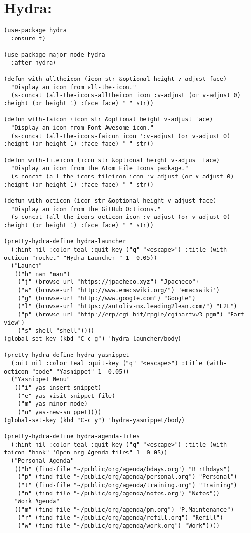 \documentclass[11pt]{article}
\begin{document}
\section{Hydra:}
\label{sec:org7b42eff}
\begin{verbatim}
(use-package hydra
  :ensure t)

(use-package major-mode-hydra
  :after hydra)

(defun with-alltheicon (icon str &optional height v-adjust face)
  "Display an icon from all-the-icon."
  (s-concat (all-the-icons-alltheicon icon :v-adjust (or v-adjust 0) :height (or height 1) :face face) " " str))

(defun with-faicon (icon str &optional height v-adjust face)
  "Display an icon from Font Awesome icon."
  (s-concat (all-the-icons-faicon icon ':v-adjust (or v-adjust 0) :height (or height 1) :face face) " " str))

(defun with-fileicon (icon str &optional height v-adjust face)
  "Display an icon from the Atom File Icons package."
  (s-concat (all-the-icons-fileicon icon :v-adjust (or v-adjust 0) :height (or height 1) :face face) " " str))

(defun with-octicon (icon str &optional height v-adjust face)
  "Display an icon from the GitHub Octicons."
  (s-concat (all-the-icons-octicon icon :v-adjust (or v-adjust 0) :height (or height 1) :face face) " " str))

(pretty-hydra-define hydra-launcher
  (:hint nil :color teal :quit-key ("q" "<escape>") :title (with-octicon "rocket" "Hydra Launcher " 1 -0.05))
  ("Launch"
   (("h" man "man")
    ("j" (browse-url "https://jpacheco.xyz") "Jpacheco")
    ("w" (browse-url "http://www.emacswiki.org/") "emacswiki")
    ("g" (browse-url "http://www.google.com") "Google")
    ("l" (browse-url "https://autoliv-mx.leading2lean.com/") "L2L")
    ("p" (browse-url "http://erp/cgi-bit/rpgle/cgipartvw3.pgm") "Part-view")
    ("s" shell "shell"))))
(global-set-key (kbd "C-c g") 'hydra-launcher/body)

(pretty-hydra-define hydra-yasnippet 
  (:nit nil :color teal :quit-key ("q" "<escape>") :title (with-octicon "code" "Yasnippet" 1 -0.05))
  ("Yasnippet Menu"
   (("i" yas-insert-snippet)
    ("e" yas-visit-snippet-file)
    ("m" yas-minor-mode)
    ("n" yas-new-snippet))))
(global-set-key (kbd "C-c y") 'hydra-yasnippet/body)

(pretty-hydra-define hydra-agenda-files
  (:hint nil :color teal :quit-key ("q" "<escape>") :title (with-faicon "book" "Open org Agenda files" 1 -0.05))
  ("Personal Agenda"
   (("b" (find-file "~/public/org/agenda/bdays.org") "Birthdays")
    ("p" (find-file "~/public/org/agenda/personal.org") "Personal")
    ("t" (find-file "~/public/org/agenda/training.org") "Training")
    ("n" (find-file "~/public/org/agenda/notes.org") "Notes"))
   "Work Agenda"
   (("m" (find-file "~/public/org/agenda/pm.org") "P.Maintenance")
    ("r" (find-file "~/public/org/agenda/refill.org") "Refill")
    ("w" (find-file "~/public/org/agenda/work.org") "Work"))))


\end{verbatim}
\end{document}

